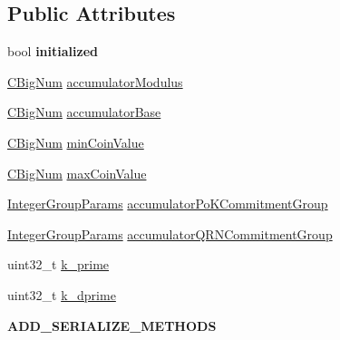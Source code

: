\subsection*{Public Attributes}
\begin{DoxyCompactItemize}
\item 
\mbox{\label{classlibzerocoin_1_1_accumulator_and_proof_params_a82c28c114373b5557f4a2ff014e4b9e8}} 
bool {\bfseries initialized}
\item 
\mbox{\hyperlink{class_c_big_num}{C\+Big\+Num}} \mbox{\hyperlink{classlibzerocoin_1_1_accumulator_and_proof_params_ab85afbda9cf8b90744dedf49636103af}{accumulator\+Modulus}}
\item 
\mbox{\hyperlink{class_c_big_num}{C\+Big\+Num}} \mbox{\hyperlink{classlibzerocoin_1_1_accumulator_and_proof_params_ace45005b583f557602be09cf1fbc9472}{accumulator\+Base}}
\item 
\mbox{\hyperlink{class_c_big_num}{C\+Big\+Num}} \mbox{\hyperlink{classlibzerocoin_1_1_accumulator_and_proof_params_ae458a09f2a99d4c2643d037196607df1}{min\+Coin\+Value}}
\item 
\mbox{\hyperlink{class_c_big_num}{C\+Big\+Num}} \mbox{\hyperlink{classlibzerocoin_1_1_accumulator_and_proof_params_a5476fb6867825f5a033c5c3dec93489e}{max\+Coin\+Value}}
\item 
\mbox{\hyperlink{classlibzerocoin_1_1_integer_group_params}{Integer\+Group\+Params}} \mbox{\hyperlink{classlibzerocoin_1_1_accumulator_and_proof_params_a7be9c99e4770069e97e4a7ff17d9845c}{accumulator\+Po\+K\+Commitment\+Group}}
\item 
\mbox{\hyperlink{classlibzerocoin_1_1_integer_group_params}{Integer\+Group\+Params}} \mbox{\hyperlink{classlibzerocoin_1_1_accumulator_and_proof_params_ab786dbc4efdd8950e5c2591c0bf6de8c}{accumulator\+Q\+R\+N\+Commitment\+Group}}
\item 
uint32\+\_\+t \mbox{\hyperlink{classlibzerocoin_1_1_accumulator_and_proof_params_ab01cb76bd259564d4401a34d289cdfcb}{k\+\_\+prime}}
\item 
uint32\+\_\+t \mbox{\hyperlink{classlibzerocoin_1_1_accumulator_and_proof_params_a9030b909ffef089f7fcffdccee6c2b2f}{k\+\_\+dprime}}
\item 
\mbox{\label{classlibzerocoin_1_1_accumulator_and_proof_params_a0c439ef0ff7afccabce5c6cf5ed56e3d}} 
{\bfseries A\+D\+D\+\_\+\+S\+E\+R\+I\+A\+L\+I\+Z\+E\+\_\+\+M\+E\+T\+H\+O\+DS}
\end{DoxyCompactItemize}


